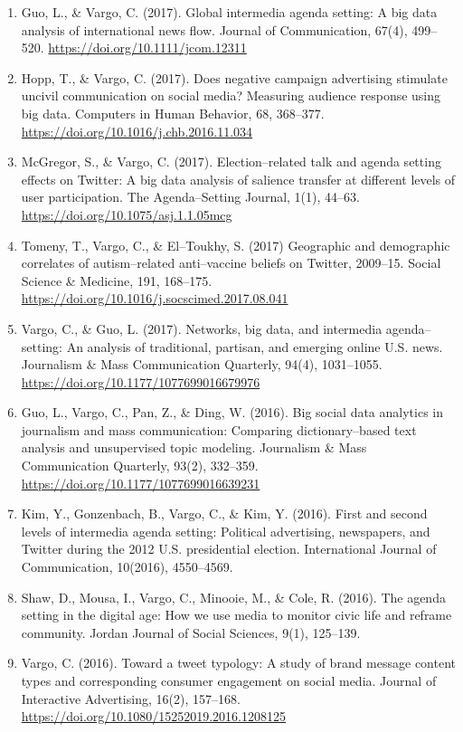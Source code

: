 \documentclass[11pt,letterpaper]{article}
\begin{document}
{\begin{enumerate}
\item Guo, L., \& Vargo, C. (2017). Global intermedia agenda setting: A big data analysis of international news flow. Journal of Communication, 67(4), 499--520. \url{https://doi.org/10.1111/jcom.12311}
\item Hopp, T., \& Vargo, C. (2017). Does negative campaign advertising stimulate uncivil communication on social media? Measuring audience response using big data. Computers in Human Behavior, 68, 368--377. \url{https://doi.org/10.1016/j.chb.2016.11.034}
\item McGregor, S., \& Vargo, C. (2017). Election--related talk and agenda setting effects on Twitter: A big data analysis of salience transfer at different levels of user participation. The Agenda--Setting Journal, 1(1), 44--63. \url{https://doi.org/10.1075/asj.1.1.05mcg}
\item Tomeny, T., Vargo, C., \& El--Toukhy, S. (2017) Geographic and demographic correlates of autism--related anti--vaccine beliefs on Twitter, 2009--15. Social Science \& Medicine, 191, 168--175. \url{https://doi.org/10.1016/j.socscimed.2017.08.041}
\item Vargo, C., \& Guo, L. (2017). Networks, big data, and intermedia agenda--setting: An analysis of traditional, partisan, and emerging online U.S. news. Journalism \& Mass Communication Quarterly, 94(4), 1031--1055. \url{https://doi.org/10.1177/1077699016679976}
\item Guo, L., Vargo, C., Pan, Z., \& Ding, W. (2016). Big social data analytics in journalism and mass communication: Comparing dictionary--based text analysis and unsupervised topic modeling. Journalism \& Mass Communication Quarterly, 93(2), 332--359. \url{https://doi.org/10.1177/1077699016639231}
\item Kim, Y., Gonzenbach, B., Vargo, C., \& Kim, Y. (2016). First and second levels of intermedia agenda setting: Political advertising, newspapers, and Twitter during the 2012 U.S. presidential election. International Journal of Communication, 10(2016), 4550--4569.
\item Shaw, D., Mousa, I., Vargo, C., Minooie, M., \& Cole, R. (2016). The agenda setting in the digital age: How we use media to monitor civic life and reframe community. Jordan Journal of Social Sciences, 9(1), 125--139.
\item Vargo, C. (2016). Toward a tweet typology: A study of brand message content types and corresponding consumer engagement on social media. Journal of Interactive Advertising, 16(2), 157--168. \url{https://doi.org/10.1080/15252019.2016.1208125}

\end{enumerate}}
\end{document}
